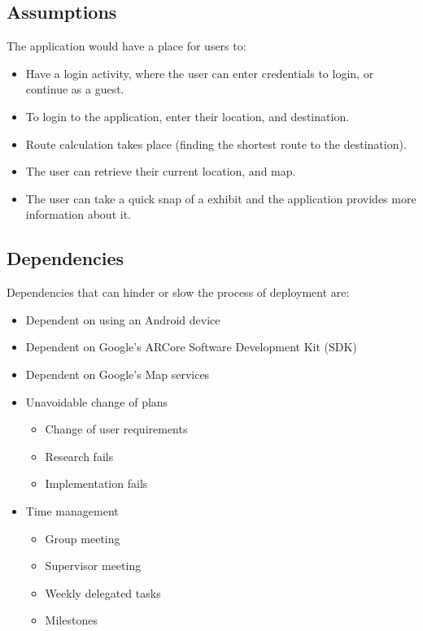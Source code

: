\documentclass[12pt]{article}
\begin{document}
\subsection{Assumptions}
The application would have a place for users to:
\begin{itemize}
    \item Have a login activity, where the user can enter credentials to login, or continue as a guest.
    \item To login to the application, enter their location, and destination.
    \item Route calculation takes place (finding the shortest route to the destination).
    \item The user can retrieve their current location, and map.
    \item The user can take a quick snap of a exhibit and the application provides more information about it.
\end{itemize}

\subsection{Dependencies}
Dependencies that can hinder or slow the process of deployment are:
\begin{itemize}
    \item Dependent on using an Android device
    \item Dependent on Google's ARCore Software Development Kit (SDK)
    \item Dependent on Google's Map services
    \item Unavoidable change of plans
    \begin{itemize}
        \item Change of user requirements
        \item Research fails
        \item Implementation fails
    \end{itemize}
    \item Time management
    \begin{itemize}
        \item Group meeting
        \item Supervisor meeting
        \item Weekly delegated tasks
        \item Milestones
    \end{itemize}
\end{itemize}
\end{document}
